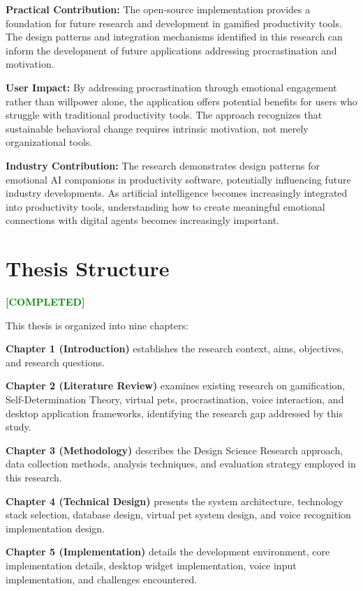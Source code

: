\documentclass[12pt,a4paper]{report}
\newcommand{\completed}{\textcolor{green}{\textbf{[COMPLETED]}}}
\begin{document}
\textbf{Practical Contribution:} The open-source implementation provides a foundation for future research and development in gamified productivity tools. The design patterns and integration mechanisms identified in this research can inform the development of future applications addressing procrastination and motivation.

\textbf{User Impact:} By addressing procrastination through emotional engagement rather than willpower alone, the application offers potential benefits for users who struggle with traditional productivity tools. The approach recognizes that sustainable behavioral change requires intrinsic motivation, not merely organizational tools.

\textbf{Industry Contribution:} The research demonstrates design patterns for emotional AI companions in productivity software, potentially influencing future industry developments. As artificial intelligence becomes increasingly integrated into productivity tools, understanding how to create meaningful emotional connections with digital agents becomes increasingly important.

\section{Thesis Structure}
\label{sec:structure}

\completed

This thesis is organized into nine chapters:

\textbf{Chapter 1 (Introduction)} establishes the research context, aims, objectives, and research questions.

\textbf{Chapter 2 (Literature Review)} examines existing research on gamification, Self-Determination Theory, virtual pets, procrastination, voice interaction, and desktop application frameworks, identifying the research gap addressed by this study.

\textbf{Chapter 3 (Methodology)} describes the Design Science Research approach, data collection methods, analysis techniques, and evaluation strategy employed in this research.

\textbf{Chapter 4 (Technical Design)} presents the system architecture, technology stack selection, database design, virtual pet system design, and voice recognition implementation design.

\textbf{Chapter 5 (Implementation)} details the development environment, core implementation details, desktop widget implementation, voice input implementation, and challenges encountered.
\end{document}
